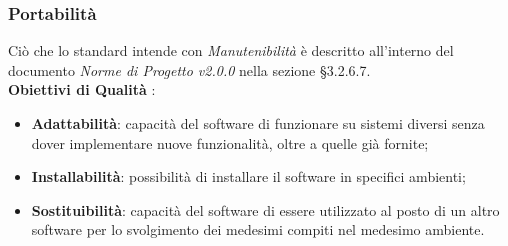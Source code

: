 \subsubsection{Portabilità}

Ciò che lo standard intende con \textit{Manutenibilità} è descritto all'interno del documento \textit{Norme di Progetto v2.0.0} nella sezione §3.2.6.7. \\

\textbf{Obiettivi di Qualità} :

\begin{itemize}
	\item \textbf{Adattabilità}: capacità del software di funzionare su sistemi diversi senza dover implementare nuove funzionalità, oltre a quelle già fornite;
	\item \textbf{Installabilità}: possibilità di installare il software in specifici ambienti;
	\item \textbf{Sostituibilità}: capacità del software di essere utilizzato al posto di un altro software per lo svolgimento dei medesimi compiti nel medesimo ambiente.
\end{itemize}

